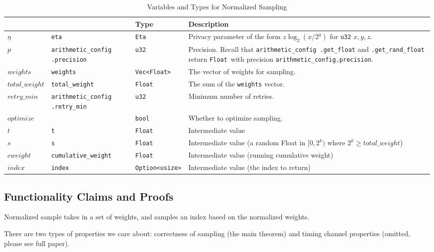 \documentclass[11pt]{article}
\theoremstyle{definition}
\newcommand{\unsigned}[1]{{\tt u#1}}
\newcommand{\Float}{{\tt Float}}
\begin{document}
\begin{table}[H]
    \centering
    \begin{tabular}{|l p{3.25cm}|l p{9cm}|} \hline
          & & Type & Description  \\\hline 
          $\eta$ & {\tt eta} & {\tt Eta} & Privacy parameter of the form $z\log_2(x/2^y)$ for \unsigned{32} $x,y,z$. \\ \hline 
        $p$ & {\tt arithmetic\_config .precision} & \unsigned{32} & Precision. Recall that {\tt arithmetic\_config .get\_float} and {\tt .get\_rand\_float} return \Float~with precision {\tt arithmetic\_config.precision}. \\ \hline 
         $weights$ & {\tt weights} & {\tt Vec<Float>} & The vector of weights for sampling. \\ \hline 
        $total\_weight$ & {\tt total\_weight} & \Float & The sum of the {\tt weights} vector. \\ \hline 
         $retry\_min$ & {\tt arithmetic\_config .retry\_min} & \unsigned{32} & Minimum number of retries.\\ \hline
        $optimize$ & {\tt } & {\tt bool} & Whether to optimize sampling. \\ \hline
        $t$ & {\tt t} & {\tt Float} & Intermediate value \\ \hline
        $s$ & {\tt s} & {\tt Float} & Intermediate value (a random Float in $[0,2^k)$ where $2^k \geq total\_weight$) \\ \hline
        $cweight$ & {\tt cumulative\_weight} & {\tt Float} & Intermediate value (running cumulative weight) \\ \hline
        $index$ & {\tt index} & {\tt Option<usize>} & Intermediate value (the index to return) \\ \hline
    \end{tabular}
    \caption{Variables and Types for Normalized Sampling}
    \label{tab:normsamp}
\end{table}
\subsection{Functionality Claims and Proofs}

Normalized sample takes in a set of weights, and samples an index based on the normalized weights.

There are two types of properties we care about: correctness of sampling (the main theorem) and timing channel properties (omitted, please see full paper).
\end{document}
